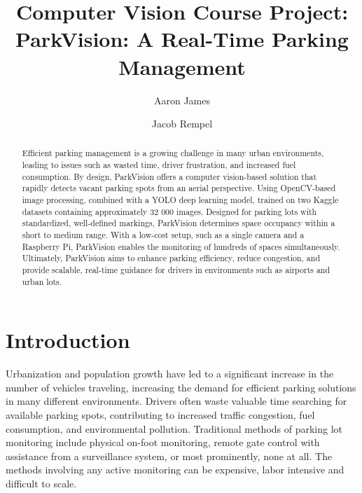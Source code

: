\documentclass[12pt, letterpaper, oneside]{article}
\title{\textbf{Computer Vision Course Project:\\ParkVision: A Real-Time Parking Management}} %
\author{Aaron James \and Jacob Rempel} %
\affiliation{Ontario Tech University} %
\begin{document}
\maketitle

\begin{abstract}
    \noindent
    
    Efficient parking management is a growing challenge in many urban environments, leading to issues such as wasted time, driver frustration, and increased fuel consumption. By design, ParkVision offers a computer vision-based solution that rapidly detects vacant parking spots from an aerial perspective. Using OpenCV-based image processing, combined with a YOLO deep learning model, trained on two Kaggle datasets containing approximately 32 000 images. Designed for parking lots with standardized, well-defined markings, ParkVision determines space occupancy within a short to medium range. With a low-cost setup, such as a single camera and a Raspberry Pi, ParkVision enables the monitoring of hundreds of spaces simultaneously. Ultimately, ParkVision aims to enhance parking efficiency, reduce congestion, and provide scalable, real-time guidance for drivers in environments such as airports and urban lots.
    
\end{abstract}

\vspace{2.5cm}


\thispagestyle{firstpage}

\pagebreak


\newgeometry{} %

\section{Introduction}
\label{sec:intro}

Urbanization and population growth have led to a significant increase in the number of vehicles traveling, increasing the demand for efficient parking solutions in many different environments. Drivers often waste valuable time searching for available parking spots, contributing to increased traffic congestion, fuel consumption, and environmental pollution. Traditional methods of parking lot monitoring include physical on-foot monitoring, remote gate control with assistance from a surveillance system, or most prominently, none at all. The methods involving any active monitoring can be expensive, labor intensive and difficult to scale.
\end{document}
